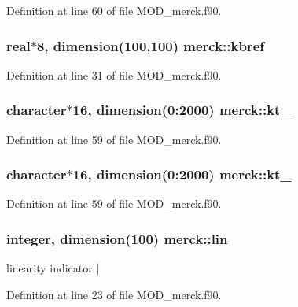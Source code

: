 Definition at line 60 of file M\-O\-D\-\_\-merck.\-f90.

\hypertarget{classmerck_ae5cbcf22c0de8f2db0f3f0861da0a0c0}{
\subsubsection[{kbref}]{\setlength{\rightskip}{0pt plus 5cm}real$\ast$8, dimension(100,100) merck\-::kbref}}\label{classmerck_ae5cbcf22c0de8f2db0f3f0861da0a0c0}


Definition at line 31 of file M\-O\-D\-\_\-merck.\-f90.

\hypertarget{classmerck_aa10f016eb3a7d8312a304167064f3a99}{
\subsubsection[{kt\-\_\-1}]{\setlength{\rightskip}{0pt plus 5cm}character$\ast$16, dimension(0\-:2000) merck\-::kt\-\_}}\label{classmerck_aa10f016eb3a7d8312a304167064f3a99}


Definition at line 59 of file M\-O\-D\-\_\-merck.\-f90.

\hypertarget{classmerck_ad41bd760bdd60d655b559de57d6c958e}{
\subsubsection[{kt\-\_\-2}]{\setlength{\rightskip}{0pt plus 5cm}character$\ast$16, dimension(0\-:2000) merck\-::kt\-\_}}\label{classmerck_ad41bd760bdd60d655b559de57d6c958e}


Definition at line 59 of file M\-O\-D\-\_\-merck.\-f90.

\hypertarget{classmerck_a1dc58cb2ea7c9c13a58dbb8649038a69}{
\subsubsection[{lin}]{\setlength{\rightskip}{0pt plus 5cm}integer, dimension(100) merck\-::lin}}\label{classmerck_a1dc58cb2ea7c9c13a58dbb8649038a69}


linearity indicator $|$ 



Definition at line 23 of file M\-O\-D\-\_\-merck.\-f90.


